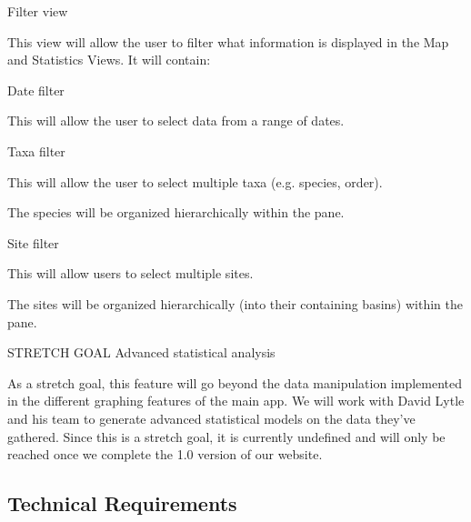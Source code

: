 \begin{list}{-}{}
\item Filter view
\begin{list}{-}{}
\item This view will allow the user to filter what information is displayed in the Map and Statistics Views.
It will contain:
\begin{list}{-}{}
\item Date filter
\begin{list}{-}{}
\item This will allow the user to select data from a range of dates.
\end{list}
\item Taxa filter
\begin{list}{-}{}
\item This will allow the user to select multiple taxa (e.g. species, order).
\item The species will be organized hierarchically within the pane.
\end{list}
\item Site filter
\begin{list}{-}{}
\item This will allow users to select multiple sites.
\item The sites will be organized hierarchically (into their containing basins) within the pane.
\end{list}
\end{list}
\end{list}

\item STRETCH GOAL Advanced statistical analysis
\begin{list}{-}{}
\item As a stretch goal, this feature will go beyond the data manipulation implemented in the different graphing features of the main app.
We will work with David Lytle and his team to generate advanced statistical models on the data they’ve gathered.
Since this is a stretch goal, it is currently undefined and will only be reached once we complete the 1.0 version of our website.
\end{list}
\end{list}

\subsection{Technical Requirements}

